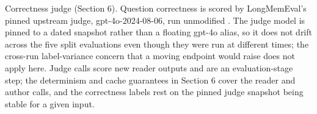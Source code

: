 Correctness judge (Section 6). Question correctness is scored by LongMemEval's pinned upstream judge, gpt-4o-2024-08-06, run unmodified \citep{wu2024longmemeval}. The judge model is pinned to a dated snapshot rather than a floating gpt-4o alias, so it does not drift across the five split evaluations even though they were run at different times; the cross-run label-variance concern that a moving endpoint would raise does not apply here. Judge calls score new reader outputs and are an evaluation-stage step; the determinism and cache guarantees in Section 6 cover the reader and author calls, and the correctness labels rest on the pinned judge snapshot being stable for a given input.


